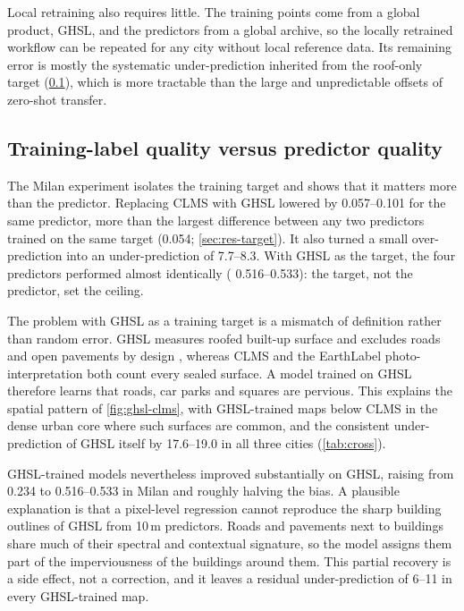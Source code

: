 Local retraining also requires little. The training points come from a
global product, GHSL, and the predictors from a global archive, so the
locally retrained workflow can be repeated for any city without local
reference data. Its remaining error is mostly the systematic
under-prediction inherited from the roof-only target (\cref{sec:disc-label}),
which is more tractable than the large and unpredictable offsets of
zero-shot transfer.

\subsection{Training-label quality versus predictor quality}
\label{sec:disc-label}

The Milan experiment isolates the training target and shows that it
matters more than the predictor. Replacing CLMS with GHSL lowered \Rsq{} by
0.057--0.101 for the same predictor, more than the largest difference
between any two predictors trained on the same target (0.054;
\cref{sec:res-target}). It also turned a small over-prediction into an
under-prediction of 7.7--8.3\pp. With GHSL as the target, the four
predictors performed almost identically (\Rsq{} 0.516--0.533): the target,
not the predictor, set the ceiling.

The problem with GHSL as a training target is a mismatch of definition
rather than random error. GHSL measures roofed built-up surface and excludes
roads and open pavements by design \cite{pesaresi2023ghsl}, whereas CLMS
\cite{clms2018imd} and the EarthLabel photo-interpretation both count every
sealed surface. A model trained on GHSL therefore learns that roads, car
parks and squares are pervious. This explains the spatial pattern of
\cref{fig:ghsl-clms}, with GHSL-trained maps below CLMS in the dense urban
core where such surfaces are common, and the consistent under-prediction of
GHSL itself by 17.6--19.0\pp{} in all three cities (\cref{tab:cross}).

GHSL-trained models nevertheless improved substantially on GHSL, raising
\Rsq{} from 0.234 to 0.516--0.533 in Milan and roughly halving the bias. A
plausible explanation is that a pixel-level regression cannot reproduce the
sharp building outlines of GHSL from 10\,m predictors. Roads and pavements
next to buildings share much of their spectral and contextual signature,
so the model assigns them part of the imperviousness of the buildings
around them. This partial recovery is a side effect, not a correction, and
it leaves a residual under-prediction of 6--11\pp{} in every GHSL-trained
map.

